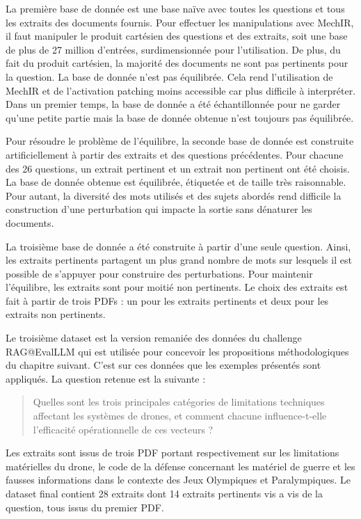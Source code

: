     La première base de donnée est une base naïve avec toutes les questions et tous les extraits des documents fournis. Pour effectuer les manipulations avec MechIR, il faut manipuler le produit cartésien des questions et des extraits, soit une base de plus de 27 million d'entrées, surdimensionnée pour l'utilisation. De plus, du fait du produit cartésien, la majorité des documents ne sont pas pertinents pour la question. La base de donnée n'est pas équilibrée. Cela rend l'utilisation de MechIR et de l'activation patching moins accessible car plus difficile à interpréter. Dans un premier temps, la base de donnée a été échantillonnée pour ne garder qu'une petite partie mais la base de donnée obtenue n'est toujours pas équilibrée. 

    Pour résoudre le problème de l'équilibre, la seconde base de donnée est construite artificiellement à partir des extraits et des questions précédentes. Pour chacune des 26 questions, un extrait pertinent et un extrait non pertinent ont été choisis. La base de donnée obtenue est équilibrée, étiquetée et de taille très raisonnable. Pour autant, la diversité des mots utilisés et des sujets abordés rend difficile la construction d'une perturbation qui impacte la sortie sans dénaturer les documents.

    La troisième base de donnée a été construite à partir d'une seule question. Ainsi, les extraits pertinents partagent un plus grand nombre de mots sur lesquels il est possible de s'appuyer pour construire des perturbations. Pour maintenir l'équilibre, les extraits sont pour moitié non pertinents. Le choix des extraits est fait à partir de trois PDFs : un pour les extraits pertinents et deux pour les extraits non pertinents. 

    Le troisième dataset est la version remaniée des données du challenge RAG@EvalLLM qui est utilisée pour concevoir les propositions méthodologiques du chapitre suivant. C'est sur ces données que les exemples présentés sont appliqués. La question retenue est la suivante :
    \begin{quote}
        Quelles sont les trois principales catégories de limitations techniques affectant les systèmes de drones, et comment chacune influence-t-elle l'efficacité opérationnelle de ces vecteurs ?
    \end{quote}

    Les extraits sont issus de trois PDF portant respectivement sur les limitations matérielles du drone, le code de la défense concernant les matériel de guerre et les fausses informations dans le contexte des Jeux Olympiques et Paralympiques. Le dataset final contient 28 extraits dont 14 extraits pertinents vis a vis de la question, tous issus du premier PDF.
    

